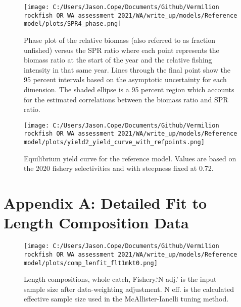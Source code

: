 \documentclass[11pt,
  english,
  a4paper,
]{article}
\begin{document}
\begin{figure}
\centering
\texttt{[image: C:/Users/Jason.Cope/Documents/Github/Vermilion rockfish OR WA assessment 2021/WA/write\_up/models/Reference model/plots/SPR4\_phase.png]}
\caption{Phase plot of the relative biomass (also referred to as fraction unfished) versus the SPR ratio where each point represents the biomass ratio at the start of the year and the relative fishing intensity in that same year. Lines through the final point show the 95 percent intervals based on the asymptotic uncertainty for each dimension. The shaded ellipse is a 95 percent region which accounts for the estimated correlations between the biomass ratio and SPR ratio.\label{fig:phase}}
\end{figure}

\tagmcend\tagstructend


\begin{figure}
\centering
\texttt{[image: C:/Users/Jason.Cope/Documents/Github/Vermilion rockfish OR WA assessment 2021/WA/write\_up/models/Reference model/plots/yield2\_yield\_curve\_with\_refpoints.png]}
\caption{Equilibrium yield curve for the reference model. Values are based on the 2020 fishery selectivities and with steepness fixed at 0.72.\label{fig:yield}}
\end{figure}

\tagmcend\tagstructend

\clearpage


\hypertarget{app-a}{%
\section{Appendix A: Detailed Fit to Length Composition Data}\label{app-a}}

\leavevmode\tagmcend\tagstructend


\begin{figure}
\centering
\texttt{[image: C:/Users/Jason.Cope/Documents/Github/Vermilion rockfish OR WA assessment 2021/WA/write\_up/models/Reference model/plots/comp\_lenfit\_flt1mkt0.png]}
\caption{Length compositions, whole catch, Fishery.`N adj.' is the input sample size after data-weighting adjustment. N eff. is the calculated effective sample size used in the McAllister-Ianelli tuning method.\label{fig:comp_lenfit_flt1mkt0}}
\end{figure}
\end{document}
